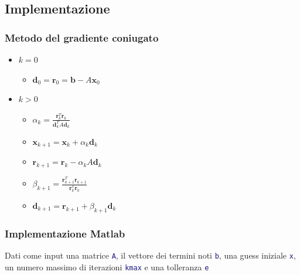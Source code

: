 \documentclass[10pt]{beamer}
\begin{document}
\subsection{Implementazione}
\begin{frame}
\frametitle{Metodo del gradiente coniugato}
\begin{itemize}
\item $k=0$
\begin{itemize}
\item $\mathbf{d}_0=\mathbf{r}_0=\mathbf{b}-A\mathbf{x}_0$
\end{itemize}   
\item $k>0$
\begin{itemize}
\item $\alpha_k=\frac{\mathbf{r}_k^T \mathbf{r}_k}{\mathbf{d}_k^T A \mathbf{d}_k}$
\item $\mathbf{x}_{k+1}=\mathbf{x}_k+\alpha_k\mathbf{d}_{k}$
\item $\mathbf{r}_{k+1}=\mathbf{r}_k-\alpha_kA\mathbf{d}_{k}$
\item $\beta_{k+1}=\frac{\mathbf{r}_{k+1}^T\mathbf{r}_{k+1}}{\mathbf{r}_{k}^T\mathbf{r}_{k}}$
\item $\mathbf{d}_{k+1}=\mathbf{r}_{k+1}+\beta_{k+1}\mathbf{d}_k$
\end{itemize}  
\end{itemize}    
\end{frame}

\begin{frame}\frametitle{Implementazione Matlab}

Dati come input
una matrice \lstinline[language=Matlab]{A}, 
il vettore dei termini noti \lstinline[language=Matlab]{b},
una guess iniziale \lstinline[language=Matlab]{x},
un numero massimo di iterazioni \lstinline[language=Matlab]{kmax}
e una tolleranza \lstinline[language=Matlab]{e}

\end{frame}
\end{document}
